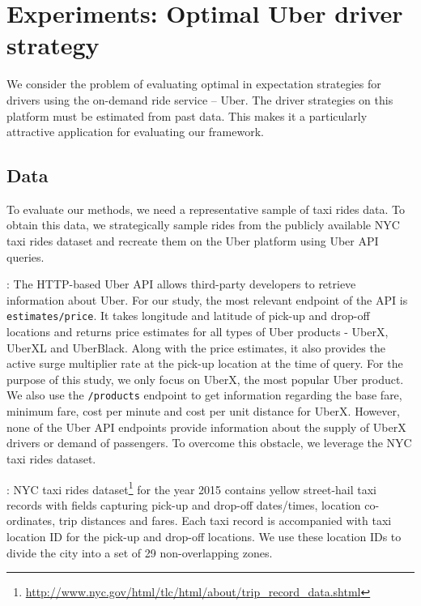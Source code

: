 
\section{Experiments: Optimal Uber driver strategy}
\label{sec:experiments}

We consider the problem of evaluating optimal in expectation strategies for drivers using the on-demand ride service -- Uber. The driver strategies on this platform must be estimated from past data. This makes it a particularly attractive application for evaluating our framework.

\subsection{Data}
\label{sec:data}
To evaluate our methods, we need a representative sample of taxi rides data. To obtain this data, we strategically sample rides from the publicly available NYC taxi rides dataset and recreate them on the Uber platform using Uber API queries.

: 
The HTTP-based Uber API allows third-party developers to retrieve information about Uber. For our study, the most relevant endpoint of the API is \texttt{estimates/price}. It takes longitude and latitude of pick-up and drop-off locations and returns price estimates for all types of Uber products - UberX, UberXL and UberBlack. Along with the price estimates, it also provides the active surge multiplier rate at the pick-up location at the time of query. For the purpose of this study, we only focus on UberX, the most popular Uber product. We also use the \texttt{/products} endpoint to get information regarding the base fare, minimum fare, cost per minute and cost per unit distance for UberX. However, none of the Uber API endpoints provide information about the supply of UberX drivers or demand of passengers. To overcome this obstacle, we leverage the NYC taxi rides dataset.

:
NYC taxi rides dataset\footnote{\url{http://www.nyc.gov/html/tlc/html/about/trip_record_data.shtml}} for the year 2015 contains yellow street-hail taxi records with fields capturing pick-up and drop-off dates/times, location co-ordinates, trip distances and fares. Each taxi record is accompanied with taxi location ID for the pick-up and drop-off locations. We use these location IDs to divide the city into a set of 29 non-overlapping zones.

